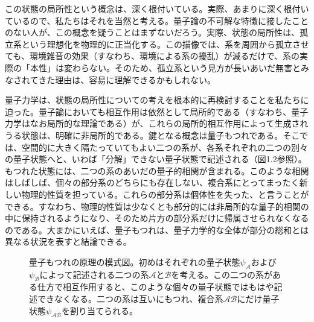 この状態の局所性という概念は、深く根付いている。実際、あまりに深く根付いているので、私たちはそれを当然と考える。量子論の不可解な特徴に接したことのない人が、この概念を疑うことはまずないだろう。実際、状態の局所性は、孤立系という理想化を物理的に正当化する。この描像では、系を周囲から孤立させても、環境雑音の効果（すなわち、環境による系の擾乱）が減るだけで、系の実際の「本性」は変わらない。そのため、孤立系という見方が長いあいだ無害とみなされてきた理由は、容易に理解できるかもしれない。

量子力学は、状態の局所性についての考えを根本的に再検討することを私たちに迫った。量子論においても相互作用は依然として局所的である（すなわち、量子力学はなお局所的な理論である）が、これらの局所的相互作用によって生成されうる状態は、明確に非局所的である。鍵となる概念は量子もつれである。そこでは、空間的に大きく隔たっていてもよい二つの系が、各系それぞれの二つの別々の量子状態へと、いわば「分解」できない量子状態で記述される（図1.2参照）。もつれた状態には、二つの系のあいだの量子的相関が含まれる。\hypertarget{srcpage:5}{}\label{srcpage:5}このような相関はしばしば、個々の部分系のどちらにも存在しない、複合系にとってまったく新しい物理的性質を担っている。これらの部分系は個体性を失った、と言うことができる。すなわち、物理的性質は少なくとも部分的には非局所的な量子的相関の中に保持されるようになり、そのため片方の部分系だけに帰属させられなくなるのである。大まかにいえば、量子もつれは、量子力学的な全体が部分の総和とは異なる状況を表すと結論できる。

\begin{figure}[htbp]\centering
{}
\caption{量子もつれの原理の模式図。初めはそれぞれの量子状態$\psi_{\mathcal A}$および$\psi_{\mathcal B}$によって記述される二つの系$\mathcal A$と$\mathcal B$を考える。この二つの系がある仕方で相互作用すると、このような個々の量子状態ではもはや記述できなくなる。二つの系は互いにもつれ、複合系$\mathcal{AB}$にだけ量子状態$\psi_{\mathcal{AB}}$を割り当てられる。}
\end{figure}

